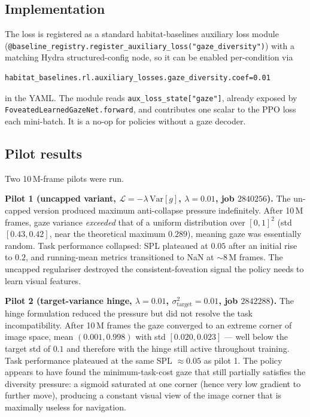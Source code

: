\documentclass[10pt,conference,compsocconf]{IEEEtran}
\begin{document}
\subsection*{Implementation}

The loss is registered as a standard habitat-baselines auxiliary loss module (\texttt{@baseline\_registry.register\_auxiliary\_loss("gaze\_diversity")}) with a matching Hydra structured-config node, so it can be enabled per-condition via
\begin{verbatim}
habitat_baselines.rl.auxiliary_losses.gaze_diversity.coef=0.01
\end{verbatim}
in the YAML. The module reads \texttt{aux\_loss\_state["gaze"]}, already exposed by \texttt{FoveatedLearnedGazeNet.forward}, and contributes one scalar to the PPO loss each mini-batch. It is a no-op for policies without a gaze decoder.

\subsection*{Pilot results}

Two 10\,M-frame pilots were run.

\textbf{Pilot 1 (uncapped variant, $\mathcal{L}=-\lambda\,\text{Var}[g]$, $\lambda=0.01$, job $2840256$).} The un-capped version produced maximum anti-collapse pressure indefinitely. After 10\,M frames, gaze variance \emph{exceeded} that of a uniform distribution over $[0,1]^2$ (std $[0.43, 0.42]$, near the theoretical maximum $0.289$), meaning gaze was essentially random. Task performance collapsed: SPL plateaued at $0.05$ after an initial rise to $0.2$, and running-mean metrics transitioned to NaN at $\sim 8$\,M frames. The uncapped regulariser destroyed the consistent-foveation signal the policy needs to learn visual features.

\textbf{Pilot 2 (target-variance hinge, $\lambda=0.01$, $\sigma^2_\text{target}=0.01$, job $2842288$).} The hinge formulation reduced the pressure but did not resolve the task incompatibility. After 10\,M frames the gaze converged to an extreme corner of image space, mean $(0.001, 0.998)$ with std $[0.020, 0.023]$ --- well below the target std of $0.1$ and therefore with the hinge still active throughout training. Task performance plateaued at the same SPL $\approx 0.05$ as pilot 1. The policy appears to have found the minimum-task-cost gaze that still partially satisfies the diversity pressure: a sigmoid saturated at one corner (hence very low gradient to further move), producing a constant visual view of the image corner that is maximally useless for navigation.
\end{document}
